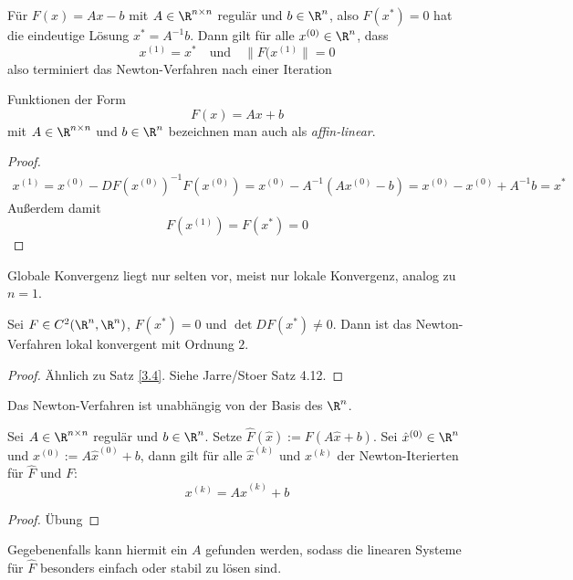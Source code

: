 \documentclass[11pt]{scrbook}
\begin{document}
\begin{lem} \label{3.22}
	Für $F(x) = Ax - b$ mit $A\in \R^{n\times n}$ regulär und $b\in \R^n$, also $F(x^*)=0$ hat die eindeutige Lösung $x^* = A^{-1}b$.
	Dann gilt für alle $x^{(0)} \in \R^n$, dass
	\[
		x^{(1)} = x^*
		\quad\text{und}\quad
		\|F(x^{(1)}\| = 0
	\]
	also terminiert das Newton-Verfahren nach einer Iteration
	\begin{note}
		Funktionen der Form
		\[
			F(x) = Ax + b
		\]
		mit $A\in \R^{n\times n}$ und $b\in \R^n$ bezeichnen man auch als \emph{affin-linear}.
	\end{note}
	\begin{proof}
		\begin{align*}
			x^{(1)} = x^{(0)} - DF(x^{(0)})^{-1}F(x^{(0)}) = x^{(0)} - A^{-1} (Ax^{(0)}-b) = x^{(0)} - x^{(0)} + A^{-1}b = x^*
		\end{align*}
		Außerdem damit
		\[
			F(x^{(1)}) = F(x^*) = 0
		\]
	\end{proof}
	\begin{note}
		Globale Konvergenz liegt nur selten vor, meist nur lokale Konvergenz, analog zu $n=1$.
	\end{note}
\end{lem}

\begin{st} \label{3.23}
	Sei $F \in C^2(\R^n, \R^n)$, $F(x^*) = 0$ und $\det DF(x^*) \neq 0$.
	Dann ist das Newton-Verfahren lokal konvergent mit Ordnung $2$.
	\begin{proof}
		Ähnlich zu Satz \ref{3.4}.
		Siehe Jarre/Stoer Satz 4.12.
	\end{proof}
\end{st}

Das Newton-Verfahren ist unabhängig von der Basis des $\R^n$.

\begin{st} \label{3.24}
	Sei $A\in \R^{n\times n}$ regulär und $b \in \R^n$.
	Setze $\hat F(\hat x) := F(A\hat x+b)$.
	Sei $\hat x^{(0)} \in \R^n$ und $x^{(0)} := A\hat x^{(0)} + b$, dann gilt für alle $\hat x^{(k)}$ und $x^{(k)}$ der Newton-Iterierten für $\hat F$ und $F$:
	\[
		x^{(k)} = A \hat x^{(k)} + b
	\]
	\begin{proof}
		Übung
	\end{proof}
	\begin{note}
		Gegebenenfalls kann hiermit ein $A$ gefunden werden, sodass die linearen Systeme für $\hat F$ besonders einfach oder stabil zu lösen sind.
	\end{note}
\end{st}
\end{document}
